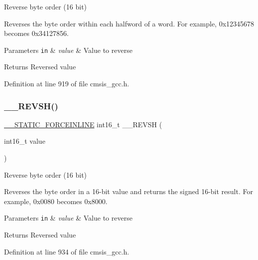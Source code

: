 Reverse byte order (16 bit) 

Reverses the byte order within each halfword of a word. For example, 0x12345678 becomes 0x34127856. 
\begin{DoxyParams}[1]{Parameters}
\mbox{\tt in}  & {\em value} & Value to reverse \\
\hline
\end{DoxyParams}
\begin{DoxyReturn}{Returns}
Reversed value 
\end{DoxyReturn}


Definition at line 919 of file cmsis\+\_\+gcc.\+h.

\mbox{\label{group___c_m_s_i_s___core___instruction_interface_gacb695341318226a5f69ed508166622ac}} 
\subsubsection{\texorpdfstring{\+\_\+\+\_\+\+R\+E\+V\+S\+H()}{\_\_REVSH()}}
{\footnotesize\ttfamily \hyperlink{cmsis__iccarm_8h_ab904513442afdf77d4f8c74f23cbb040}{\+\_\+\+\_\+\+S\+T\+A\+T\+I\+C\+\_\+\+F\+O\+R\+C\+E\+I\+N\+L\+I\+NE} int16\+\_\+t \+\_\+\+\_\+\+R\+E\+V\+SH (\begin{DoxyParamCaption}\item[{int16\+\_\+t}]{value }\end{DoxyParamCaption})}



Reverse byte order (16 bit) 

Reverses the byte order in a 16-\/bit value and returns the signed 16-\/bit result. For example, 0x0080 becomes 0x8000. 
\begin{DoxyParams}[1]{Parameters}
\mbox{\tt in}  & {\em value} & Value to reverse \\
\hline
\end{DoxyParams}
\begin{DoxyReturn}{Returns}
Reversed value 
\end{DoxyReturn}


Definition at line 934 of file cmsis\+\_\+gcc.\+h.

\mbox{\label{group___c_m_s_i_s___core___instruction_interface_gab16acb6456176f1e87a4f2724c2b6028}} 
